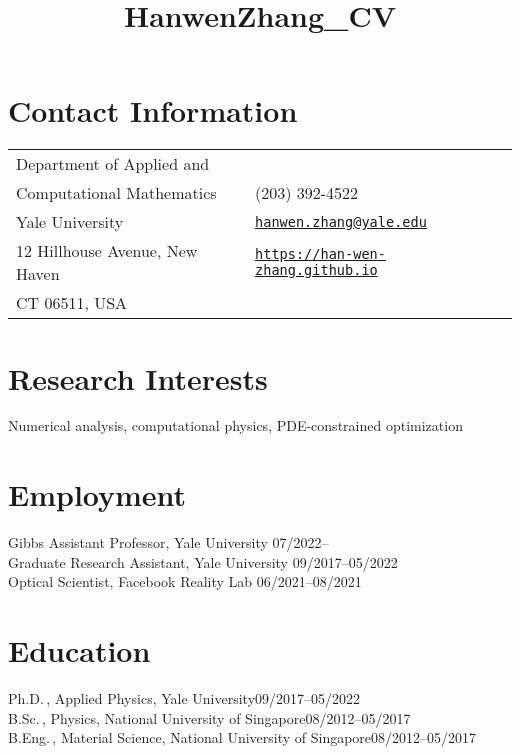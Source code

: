 \documentclass[margin,line,pifont,palatino,courier]{res}
\begin{document}
\title{HanwenZhang_CV}
\begin{resume}

\section{\sc Contact Information}

\vspace{.05in}
\begin{tabular}{@{}p{2.75in}p{2in}}
Department of Applied  and &  \\
Computational Mathematics & (203) 392-4522 \\
Yale University &  
\href{mailto:hanwen.zhang@yale.edu}
{\texttt{hanwen.zhang@yale.edu}}\\
12 Hillhouse Avenue, New Haven & 
\href{https://han-wen-zhang.github.io/}
{\texttt{https://han-wen-zhang.github.io}}\\
 CT 06511, USA   & \\
             
\end{tabular}

\section{\sc Research Interests}
Numerical analysis, computational physics, PDE-constrained optimization

\section{\sc Employment}
Gibbs Assistant Professor, Yale University \hfill  07/2022-- \hspace*{1.12cm}\\
Graduate Research Assistant, Yale University \hfill 09/2017--05/2022\\
Optical Scientist, Facebook Reality Lab \hfill 06/2021--08/2021

\section{\sc Education}
Ph.D.\,, Applied Physics, Yale University\hfill 09/2017--05/2022\\
B.Sc.\,, Physics, National University of Singapore\hfill 08/2012--05/2017\\
B.Eng.\,, Material Science, National University of Singapore\hfill 08/2012--05/2017


\end{resume}
\end{document}
